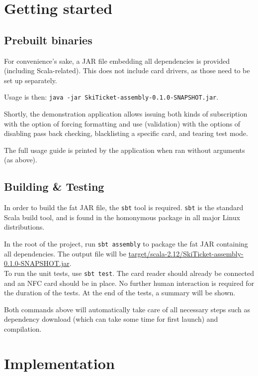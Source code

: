 \documentclass[paper=a4, fontsize=11pt]{scrartcl}
\begin{document}
\section{Getting started}

\subsection{Prebuilt binaries}

For convenience's sake, a JAR file embedding all dependencies is provided
(including Scala-related).
This does not include card drivers, as those need to be set up separately.

Usage is then: \texttt{java -jar SkiTicket-assembly-0.1.0-SNAPSHOT.jar}.

Shortly, the demonstration application allows issuing both kinds of subscription
with the option of forcing formatting and use (validation) with the options of
disabling pass back checking, blacklisting a specific card, and tearing test
mode.

The full usage guide is printed by the application when ran without arguments
(as above).

\subsection{Building \& Testing}

In order to build the fat JAR file, the \texttt{sbt} tool is required.
\texttt{sbt} is the standard Scala build tool, and is found in the homonymous
package in all major Linux distributions.

In the root of the project, run \texttt{sbt assembly} to package the fat JAR
containing all dependencies.
The output file will be
\url{target/scala-2.12/SkiTicket-assembly-0.1.0-SNAPSHOT.jar}.
\\

To run the unit tests, use \texttt{sbt test}.
The card reader should already be connected and an NFC card should be in place.
No further human interaction is required for the duration of the tests.
At the end of the tests, a summary will be shown.

Both commands above will automatically take care of all necessary steps such as
dependency download (which can take some time for first launch) and compilation.

\section{Implementation}
\end{document}
